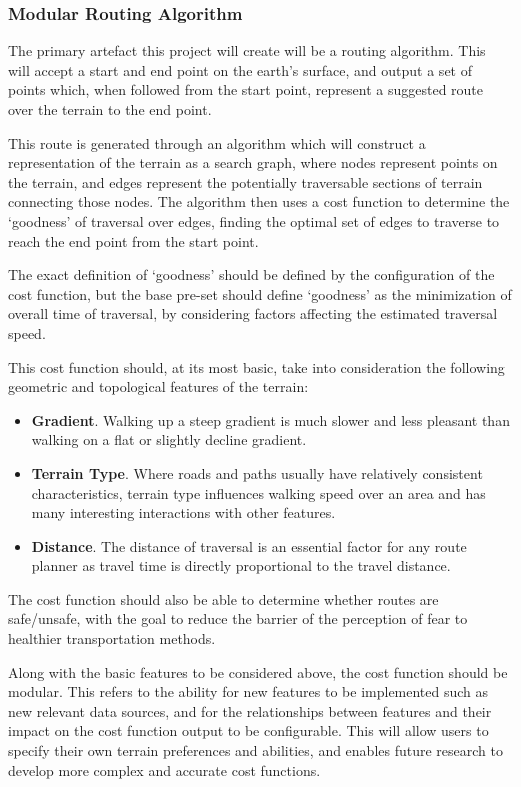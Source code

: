 \documentclass[12pt]{article}
\begin{document}
\subsubsection{Modular Routing Algorithm}

The primary artefact this project will create will be a routing algorithm. This will accept a start and end point on the earth's surface, and output a set of points which, when followed from the start point, represent a suggested route over the terrain to the end point.

This route is generated through an algorithm which will construct a representation of the terrain as a search graph, where nodes represent points on the terrain, and edges represent the potentially traversable sections of terrain connecting those nodes. The algorithm then uses a cost function to determine the `goodness' of traversal over edges, finding the optimal set of edges to traverse to reach the end point from the start point.

The exact definition of `goodness' should be defined by the configuration of the cost function, but the base pre-set should define `goodness' as the minimization of overall time of traversal, by considering factors affecting the estimated traversal speed.

This cost function should, at its most basic, take into consideration the following geometric and topological features of the terrain:

\begin{itemize}
  \item \textbf{Gradient}. Walking up a steep gradient is much slower and less pleasant than walking on a flat or slightly decline gradient.
  \item \textbf{Terrain Type}. Where roads and paths usually have relatively consistent characteristics, terrain type influences walking speed over an area and has many interesting interactions with other features.
  \item \textbf{Distance}. The distance of traversal is an essential factor for any route planner as travel time is directly proportional to the travel distance.
\end{itemize}

The cost function should also be able to determine whether routes are safe/unsafe, with the goal to reduce the barrier of the perception of fear to healthier transportation methods.

Along with the basic features to be considered above, the cost function should be modular. This refers to the ability for new features to be implemented such as new relevant data sources, and for the relationships between features and their impact on the cost function output to be configurable. This will allow users to specify their own terrain preferences and abilities, and enables future research to develop more complex and accurate cost functions.
\end{document}
